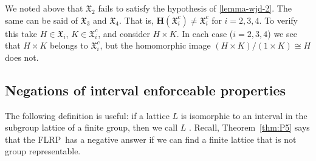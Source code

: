 \documentclass[11pt]{amsart}
\theoremstyle{plain}
\theoremstyle{definition}
\theoremstyle{remark}
\numberwithin{theorem}{section}
\numberwithin{claim}{section}
\numberwithin{equation}{section}
\numberwithin{conjecture}{section}
\newcommand{\<}{\ensuremath{\langle}}
\renewcommand{\>}{\ensuremath{\rangle}}
\newcommand{\FLRP}{{\small FLRP}}
\newcommand{\0}{\ensuremath{\mathbf{0}}}
\newcommand{\1}{\ensuremath{\mathbf{1}}}
\newcommand{\2}{\ensuremath{\mathbf{2}}}
\newcommand{\3}{\ensuremath{\mathbf{3}}}
\newcommand{\4}{\ensuremath{\mathbf{4}}}
\newcommand{\5}{\ensuremath{\mathbf{5}}}
\newcommand{\sG}{\ensuremath{\mathfrak{X}}}
\newcommand{\bH}{\ensuremath{\mathbf{H}}}
\begin{document}
We noted above that $\sG_2$ fails to satisfy the hypothesis of
\ref{lemma-wjd-2}. The same can be said of $\sG_3$ and $\sG_4$. That is, 
$\bH(\sG_i^c) \neq \sG_i^c$ for $i= 2, 3, 4$.  To verify this take $H\in
\sG_i$, $K\in \sG_i^c$, and consider $H\times K$.  In each case ($i=2, 3, 4$) we
see that $H\times K$ belongs to $\sG_i^c$, but the homomorphic image
$(H\times K)/(1\times K) \cong H$ does not. 

\subsection{Negations of interval enforceable properties}
\label{sec:negat-interv-enforc}
The following definition is useful: if a lattice $L$
is isomorphic to an interval in the subgroup lattice of a finite group, then we call
$L$ .  Recall, Theorem~\ref{thm:P5} says that the
\FLRP\ has a negative answer if we can find a finite lattice that is not group
representable. 
\end{document}
